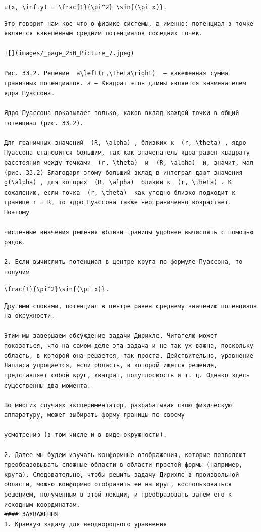 \documentclass[
  ukrainian,
]{article}
\begin{document}
\texttt{u(x,\ \textbackslash{}infty)\ =\ \textbackslash{}frac\{1\}\{\textbackslash{}pi\^{}2\}\ \textbackslash{}sin\{(\textbackslash{}pi\ x)\}.}

\begin{verbatim}
Это говорит нам кое-что о физике системы, а именно: потенциал в точке является взвешенным средним потенциалов соседних точек.

![](images/_page_250_Picture_7.jpeg)

Рис. 33.2. Решение  a\left(r,\theta\right)  — взвешенная сумма граничных потенциалов. a — Квадрат этон длины является знаменателем ядра Пуассона.

Ядро Пуассона показывает только, каков вклад каждой точки в общий потенциал (рис. 33.2).

Для граничных значений  (R, \alpha) , близких к  (r, \theta) , ядро Пуассона становится большим, так как значенатель ядра равен квадрату расстояния между точками  (r, \theta)  и  (R, \alpha)  и, значит, мал (рис. 33.2) Благодаря этому больший вклад в интеграл дают значения  g(\alpha) , для которых  (R, \alpha)  близки к  (r, \theta) . К сожалению, если точка  (r, \theta)  как угодно близко подходит к границе r = R, то ядро Пуассона также неограниченно возрастает. Поэтому

численные вначения решения вблизи границы удобнее вычислять с помощью рядов.

2. Если вычислить потенциал в центре круга по формуле Пуассона, то получим
\end{verbatim}

\texttt{\textbackslash{}frac\{1\}\{\textbackslash{}pi\^{}2\}\textbackslash{}sin\{(\textbackslash{}pi\ x)\}.}

\begin{verbatim}
Другими словами, потенциал в центре равен среднему значению потенциала на окружности.

Этим мы завершаем обсуждение задачи Дирихле. Читателю может показаться, что на самом деле эта задача и не так уж важна, поскольку область, в которой она решается, так проста. Действительно, уравнение Лапласа упрощается, если область, в которой ищется решение, представляет собой круг, квадрат, полуплоскость и т. д. Однако здесь существенны два момента.

Во многих случаях экспериментатор, разрабатывая свою физическую аппаратуру, может выбирать форму границы по своему

усмотрению (в том числе и в виде окружности).

2. Далее мы будем изучать конформные отображения, которые позволяют преобразовывать сложные области в области простой формы (например, круга). Следовательно, чтобы решить задачу Дирихле в произвольной области, можно конформно отобразить ее на круг, воспользоваться решением, полученным в этой лекции, и преобразовать затем его к исходным координатам.
#### ЗАУВАЖЕННЯ
1. Краевую задачу для неоднородного уравнения
\end{verbatim}
\end{document}
